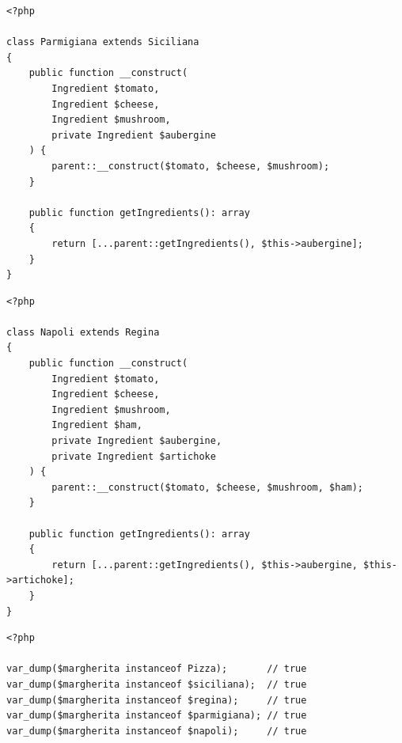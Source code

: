\begin{frame}[fragile,c]
    \begin{lstlisting}
<?php

class Parmigiana extends Siciliana
{
    public function __construct(
        Ingredient $tomato,
        Ingredient $cheese,
        Ingredient $mushroom,
        private Ingredient $aubergine
    ) {
        parent::__construct($tomato, $cheese, $mushroom);
    }

    public function getIngredients(): array
    {
        return [...parent::getIngredients(), $this->aubergine];
    }
}
    \end{lstlisting}
\end{frame}

\begin{frame}[fragile,c]
    \begin{lstlisting}
<?php

class Napoli extends Regina
{
    public function __construct(
        Ingredient $tomato,
        Ingredient $cheese,
        Ingredient $mushroom,
        Ingredient $ham,
        private Ingredient $aubergine,
        private Ingredient $artichoke
    ) {
        parent::__construct($tomato, $cheese, $mushroom, $ham);
    }

    public function getIngredients(): array
    {
        return [...parent::getIngredients(), $this->aubergine, $this->artichoke];
    }
}
    \end{lstlisting}
\end{frame}

\begin{frame}[fragile,c]
    \begin{lstlisting}
<?php

var_dump($margherita instanceof Pizza);       // true
var_dump($margherita instanceof $siciliana);  // true
var_dump($margherita instanceof $regina);     // true
var_dump($margherita instanceof $parmigiana); // true
var_dump($margherita instanceof $napoli);     // true
    \end{lstlisting}
\end{frame}

